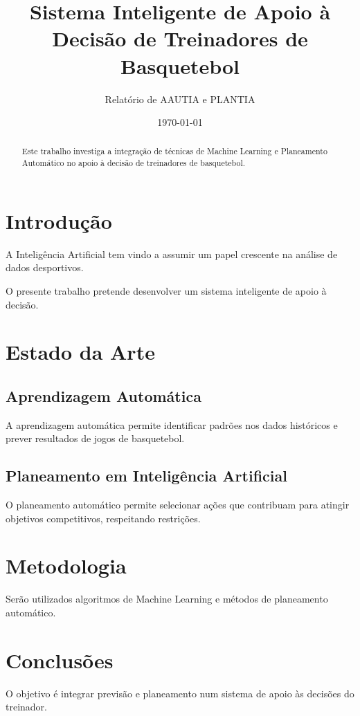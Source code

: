\documentclass[12pt,a4paper]{article}
\title{Sistema Inteligente de Apoio à Decisão
de Treinadores de Basquetebol}
\author{Relatório de AAUTIA e PLANTIA}
\date{\today}
\begin{document}
\maketitle

\begin{abstract}
Este trabalho investiga a integração de técnicas
de Machine Learning e Planeamento Automático
no apoio à decisão de treinadores de basquetebol.
\end{abstract}

\tableofcontents
\newpage

\section{Introdução}

A Inteligência Artificial tem vindo a assumir
um papel crescente na análise de dados desportivos.

O presente trabalho pretende desenvolver um
sistema inteligente de apoio à decisão.

\section{Estado da Arte}

\subsection{Aprendizagem Automática}

A aprendizagem automática permite identificar
padrões nos dados históricos e prever resultados
de jogos de basquetebol.

\subsection{Planeamento em Inteligência Artificial}

O planeamento automático permite selecionar
ações que contribuam para atingir objetivos
competitivos, respeitando restrições.

\section{Metodologia}

Serão utilizados algoritmos de Machine Learning
e métodos de planeamento automático.

\section{Conclusões}

O objetivo é integrar previsão e planeamento
num sistema de apoio às decisões do treinador.
\end{document}
